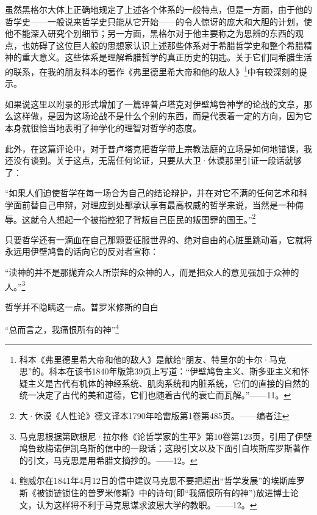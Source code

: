 \documentclass[a4paper,twoside,12pt]{ctexart}
\begin{document}
虽然黑格尔大体上正确地规定了上述各个体系的一般特点，但是一方面，由于他的哲学史——一般说来哲学史只能从它开始——的令人惊讶的庞大和大胆的计划，使他不能深入研究个别细节；另一方面，黑格尔对于他主要称之为思辨的东西的观点，也妨碍了这位巨人般的思想家认识上述那些体系对于希腊哲学史和整个希腊精神的重大意义。这些体系是理解希腊哲学的真正历史的钥匙。关于它们同希腊生活的联系，在我的朋友科本的著作《弗里德里希大帝和他的敌人》\footnote{科本《弗里德里希大帝和他的敌人》是献给“朋友、特里尔的卡尔·马克思”的。科本在该书1840年版第39页上写道：“伊壁鸠鲁主义、斯多亚主义和怀疑主义是古代有机体的神经系统、肌肉系统和内脏系统，它们的直接的自然的统一决定了古代的美和道德，它们也随着古代的衰亡而瓦解。”——11。}中有较深刻的提示。

如果说这里以附录的形式增加了一篇评普卢塔克对伊壁鸠鲁神学的论战的文章，那么这样做，是因为这场论战不是什么个别的东西，而是代表着一定的方向，因为它本身就很恰当地表明了神学化的理智对哲学的态度。

此外，在这篇评论中，对于普卢塔克把哲学带上宗教法庭的立场是如何地错误，我还没有谈到。关于这点，无需任何论证，只要从大卫·休谟那里引证一段话就够了：

\begin{fangsong}
    “如果人们迫使哲学在每一场合为自己的结论辩护，并在对它不满的任何艺术和科学面前替自己申辩，对理应到处都承认享有最高权威的哲学来说，当然是一种侮辱。这就令人想起一个被指控犯了背叛自己臣民的叛国罪的国王。”\footnote{大·休谟《人性论》德文译本1790年哈雷版第1卷第485页。——编者注}
\end{fangsong}

只要哲学还有一滴血在自己那颗要征服世界的、绝对自由的心脏里跳动着，它就将永远用伊壁鸠鲁的话向它的反对者宣称：

\begin{fangsong}
    “渎神的并不是那抛弃众人所崇拜的众神的人，而是把众人的意见强加于众神的人。”\footnote{马克思根据第欧根尼·拉尔修《论哲学家的生平》第10卷第123页，引用了伊壁鸠鲁致梅诺伊凯乌斯的信中的一段话；这段引文以及下面引自埃斯库罗斯著作的引文，马克思是用希腊文摘抄的。——12。}
\end{fangsong}

哲学并不隐瞒这一点。普罗米修斯的自白

\begin{fangsong}
    “总而言之，我痛恨所有的神”\footnote{鲍威尔在1841年4月12日的信中建议马克思不要把超出“哲学发展”的埃斯库罗斯《被锁链锁住的普罗米修斯》中的诗句(即“我痛恨所有的神”)放进博士论文，认为这样将不利于马克思谋求波恩大学的教职。——12。}
\end{fangsong}
\end{document}
